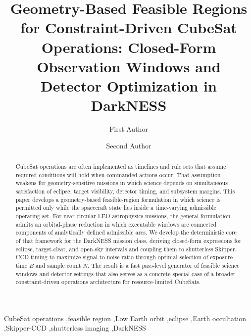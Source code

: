 \documentclass[preprint,12pt]{elsarticle}
\theoremstyle{definition}
\theoremstyle{remark}
\begin{document}
\begin{frontmatter}

\title{Geometry-Based Feasible Regions for Constraint-Driven CubeSat Operations: Closed-Form Observation Windows and Detector Optimization in DarkNESS}

\author[inst1]{First Author}
\author[inst2]{Second Author}




\begin{abstract}
CubeSat operations are often implemented as timelines and rule sets that assume required conditions will hold when commanded actions occur.
That assumption weakens for geometry-sensitive missions in which science depends on simultaneous satisfaction of eclipse, target visibility, detector timing, and subsystem margins.
This paper develops a geometry-based feasible-region formulation in which science is permitted only while the spacecraft state lies inside a time-varying admissible operating set.
For near-circular LEO astrophysics missions, the general formulation admits an orbital-phase reduction in which executable windows are connected components of analytically defined admissible arcs.
We develop the deterministic core of that framework for the DarkNESS mission class, deriving closed-form expressions for eclipse, target-clear, and open-sky intervals and coupling them to shutterless Skipper-CCD timing to maximize signal-to-noise ratio through optimal selection of exposure time $B$ and sample count $N$.
The result is a fast pass-level generator of feasible science windows and detector settings that also serves as a concrete special case of a broader constraint-driven operations architecture for resource-limited CubeSats.
\end{abstract}

\begin{keyword}
CubeSat operations \sep feasible region \sep Low Earth orbit \sep eclipse \sep Earth occultation \sep Skipper-CCD \sep shutterless imaging \sep DarkNESS
\end{keyword}

\end{frontmatter}
\end{document}
